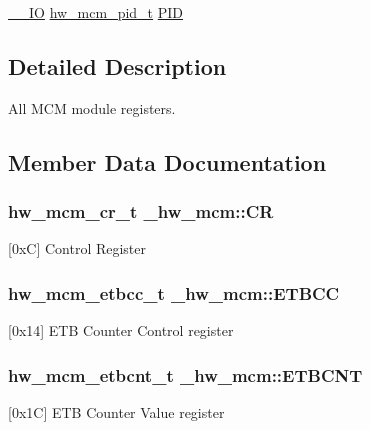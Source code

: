 \begin{DoxyCompactItemize}
\item 
\hyperlink{core__sc300_8h_aec43007d9998a0a0e01faede4133d6be}{\+\_\+\+\_\+\+IO} \hyperlink{union__hw__mcm__pid}{hw\+\_\+mcm\+\_\+pid\+\_\+t} \hyperlink{struct__hw__mcm_a475d7d2a5da2fa95dc65b2767dd6ff3c}{P\+ID}
\end{DoxyCompactItemize}


\subsection{Detailed Description}
All M\+CM module registers. 

\subsection{Member Data Documentation}
\subsubsection[{\texorpdfstring{CR}{CR}}]{ {\bf hw\+\_\+mcm\+\_\+cr\+\_\+t} \+\_\+hw\+\_\+mcm\+::\+CR}\hypertarget{struct__hw__mcm_a8d7d6eab73eb82ceaa97e4e45111b141}{}\label{struct__hw__mcm_a8d7d6eab73eb82ceaa97e4e45111b141}
\mbox{[}0xC\mbox{]} Control Register 
\subsubsection[{\texorpdfstring{E\+T\+B\+CC}{ETBCC}}]{ {\bf hw\+\_\+mcm\+\_\+etbcc\+\_\+t} \+\_\+hw\+\_\+mcm\+::\+E\+T\+B\+CC}\hypertarget{struct__hw__mcm_a90356afbefdcbceef2f39f0fe03737af}{}\label{struct__hw__mcm_a90356afbefdcbceef2f39f0fe03737af}
\mbox{[}0x14\mbox{]} E\+TB Counter Control register 
\subsubsection[{\texorpdfstring{E\+T\+B\+C\+NT}{ETBCNT}}]{ {\bf hw\+\_\+mcm\+\_\+etbcnt\+\_\+t} \+\_\+hw\+\_\+mcm\+::\+E\+T\+B\+C\+NT}\hypertarget{struct__hw__mcm_a8fb53896a3eef0950171f7be2e0d7e11}{}\label{struct__hw__mcm_a8fb53896a3eef0950171f7be2e0d7e11}
\mbox{[}0x1C\mbox{]} E\+TB Counter Value register 
